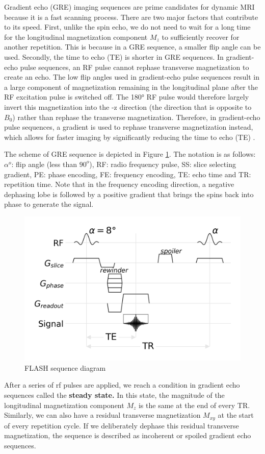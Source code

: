 \documentclass{micro-econ-thesis}
\begin{document}
Gradient echo (GRE) imaging sequences are prime candidates for dynamic MRI because it is a fast scanning process. There are two major factors that contribute to its speed. First, unlike the spin echo, we do not need to wait for a long time for the longitudinal magnetization component $M_z$ to sufficiently recover for another repetition. This is because in a GRE sequence, a smaller flip angle can be used. Secondly, the time to echo (TE) is shorter in GRE sequences. In gradient-echo pulse sequences, an RF pulse cannot rephase transverse magnetization to create an echo. The low flip angles used in gradient-echo pulse sequences result in a large component of magnetization remaining in the longitudinal plane after the RF excitation pulse is switched off. The 180° RF pulse would therefore largely invert this magnetization into the -z direction (the direction that is opposite to $B_0$) rather than rephase the transverse magnetization. Therefore, in gradient-echo pulse sequences, a gradient is used to rephase transverse magnetization instead, which allows for faster imaging by significantly reducing the time to echo (TE) \parencite[p.94]{westbrook_mri_2019}.

The scheme of GRE sequence is depicted in Figure \ref{fig:gresimplified}. The notation is as follows: $\alpha^o$: flip angle (less than $90^o$), RF: radio frequency pulse, SS: slice selecting gradient, PE: phase encoding, FE: frequency encoding, TE: echo time and TR: repetition time. Note that in the frequency encoding direction, a negative dephasing lobe is followed by a positive gradient that brings the spins back into phase to generate the signal.    
\begin{figure}[H]
	\centering
	\includegraphics[width=0.7\linewidth]{flash_seq}
	\caption{FLASH sequence diagram}
	\label{fig:gresimplified}
\end{figure}

After a series of rf pulses are applied, we reach a condition in gradient echo sequences called the \textbf{steady state.} In this state, the magnitude of the longitudinal magnetization component $M_z$ is the same at the end of every TR. Similarly, we can also have a residual transverse magnetization $M_{xy}$ at the start of every repetition cycle. If we deliberately dephase this residual transverse magnetization, the sequence is described as incoherent or spoiled gradient echo sequences.
\end{document}
